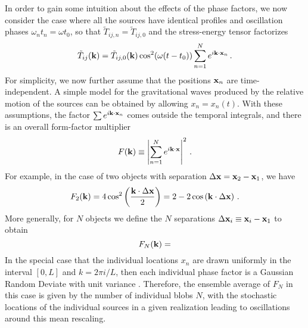 \documentclass{revtex4}
\begin{document}
In order to gain some intuition about the effects of the phase factors,
we now consider the case where all the sources have identical profiles and oscillation phases $\omega_nt_n = \omega t_0$, so that $\tilde{T}_{ij,n} = \tilde{T}_{ij,0}$ and the stress-energy tensor factorizes
\begin{equation}
  \tilde{T}_{ij}({\bf k}) = \tilde{T}_{ij,0}({\bf k})\cos^2(\omega (t-t_0)) \sum_{n=1}^N e^{i{\bf k}\cdot{\bf x}_n} \, .
\end{equation}
For simplicity, we now further assume that the positions ${\bf x}_n$ are time-independent.
A simple model for the gravitational waves produced by the relative motion of the sources can be obtained by allowing $x_n = x_n(t)$.
With these assumptions, the factor $\sum e^{i{\bf k}\cdot{\bf x}_n}$ comes outside the temporal integrals, and there is an overall form-factor multiplier
\begin{equation}
  F({\bf k}) \equiv \left|\sum_{n=1}^N e^{i{\bf k}\cdot{\bf x}}\right|^2 \, .
\end{equation}
For example, in the case of two objects with separation $\Delta{\bf x} = {\bf x}_2-{\bf x}_1$, we have
\begin{equation}
  F_2({\bf k}) = 4\cos^2\left(\frac{{\bf k}\cdot\Delta{\bf x}}{2}\right) = 2 - 2\cos\left({\bf k}\cdot\Delta{\bf x}\right) \, .
\end{equation}
More generally, for $N$ objects we define the $N$ separations $\Delta{\bf x}_i \equiv {\bf x}_i-{\bf x}_1$ to obtain
\begin{equation}
  F_N({\bf k}) = 
\end{equation}
In the special case that the individual locations $x_n$ are drawn uniformly in the interval $[0,L]$ and $k = 2\pi i / L$, then each individual phase factor is a Gaussian Random Deviate with unit variance .
Therefore, the ensemble average of $F_N$ in this case is given by the number of individual blobs $N$, with the stochastic locations of the individual sources in a given realization leading to oscillations around this mean rescaling.
\end{document}
